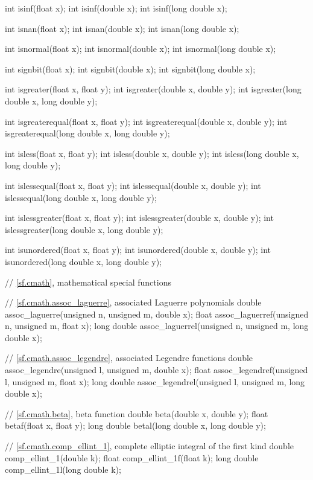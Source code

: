 \begin{codeblock}
{  int isinf(float x);
  int isinf(double x);
  int isinf(long double x);

  int isnan(float x);
  int isnan(double x);
  int isnan(long double x);

  int isnormal(float x);
  int isnormal(double x);
  int isnormal(long double x);

  int signbit(float x);
  int signbit(double x);
  int signbit(long double x);

  int isgreater(float x, float y);
  int isgreater(double x, double y);
  int isgreater(long double x, long double y);

  int isgreaterequal(float x, float y);
  int isgreaterequal(double x, double y);
  int isgreaterequal(long double x, long double y);

  int isless(float x, float y);
  int isless(double x, double y);
  int isless(long double x, long double y);

  int islessequal(float x, float y);
  int islessequal(double x, double y);
  int islessequal(long double x, long double y);

  int islessgreater(float x, float y);
  int islessgreater(double x, double y);
  int islessgreater(long double x, long double y);

  int isunordered(float x, float y);
  int isunordered(double x, double y);
  int isunordered(long double x, long double y);

  // \ref{sf.cmath}, mathematical special functions

  // \ref{sf.cmath.assoc_laguerre}, associated Laguerre polynomials
  double       assoc_laguerre(unsigned n, unsigned m, double x);
  float        assoc_laguerref(unsigned n, unsigned m, float x);
  long double  assoc_laguerrel(unsigned n, unsigned m, long double x);

  // \ref{sf.cmath.assoc_legendre}, associated Legendre functions
  double       assoc_legendre(unsigned l, unsigned m, double x);
  float        assoc_legendref(unsigned l, unsigned m, float x);
  long double  assoc_legendrel(unsigned l, unsigned m, long double x);

  // \ref{sf.cmath.beta}, beta function
  double       beta(double x, double y);
  float        betaf(float x, float y);
  long double  betal(long double x, long double y);

  // \ref{sf.cmath.comp_ellint_1}, complete elliptic integral of the first kind
  double       comp_ellint_1(double k);
  float        comp_ellint_1f(float k);
  long double  comp_ellint_1l(long double k);

}
\end{codeblock}
